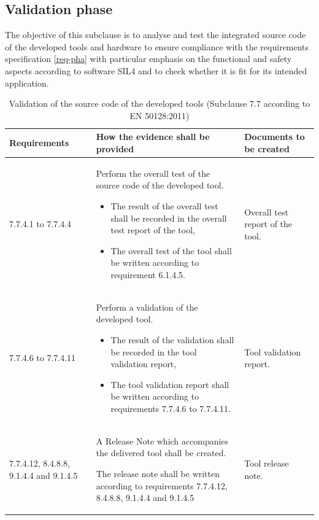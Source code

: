 \documentclass{template/openetcs_report}
\begin{document}
\subsection{Validation phase}
\begin{flushleft}
The objective of this subclause is to analyse and test the integrated source code of the developed tools and hardware to ensure compliance with the requirements specification \ref{req-pha} with particular emphasis on the functional and safety aspects according to software SIL4 and to check whether it is fit for its
intended application. 
\end{flushleft}
{\footnotesize\sffamily\centering
\begin{longtable}{|p{2cm}|p{9cm}|p{3cm}|}
\caption{Validation of the source code of the developed tools (Subclause 7.7 according to EN 50128:2011)}\\
\hline
\bfseries Requirements & \bfseries How the evidence shall be provided & \bfseries Documents to be created\\
\hline
\hline
\endhead
\hline
\endfoot

7.7.4.1 to 7.7.4.4 & Perform the overall test of the source code of the developed tool.
\begin{itemize}\itemsep=0pt
  \item The result of the overall test shall be recorded in the overall test report of the tool,
  \item The overall test of the tool shall be written according to requirement 6.1.4.5. 
\end{itemize}
& Overall test report of the tool.\\ 
\hline
7.7.4.6 to 7.7.4.11 & Perform a validation of the developed tool.
\begin{itemize}\itemsep=0pt
  \item The result of the validation shall be recorded in the tool validation report,
  \item The tool validation report shall be written according to requirements 7.7.4.6 to 7.7.4.11. 
\end{itemize}
& Tool validation report.\\ 
\hline
7.7.4.12, 8.4.8.8, 9.1.4.4 and 9.1.4.5 & A Release Note which accompanies the delivered tool shall be created.

The release note shall be written according to requirements 7.7.4.12, 8.4.8.8, 9.1.4.4 and 9.1.4.5
& Tool release note.\\ 
\hline
\end{longtable}}
\end{document}
